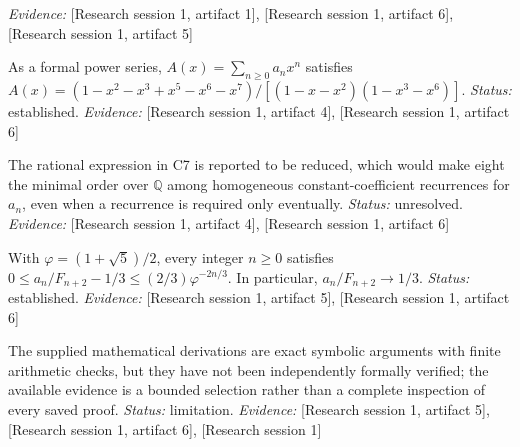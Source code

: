 \documentclass[11pt]{article}
\begin{document}
\begin{sloppypar}
\begin{description}
\textit{Evidence: }[Research session 1, artifact 1], [Research session 1, artifact 6], [Research session 1, artifact 5]
\item[C7] As a formal power series, $A(x)=\sum_{n\geq 0}a_nx^n$ satisfies $A(x)=(1-x^2-x^3+x^5-x^6-x^7)/[(1-x-x^2)(1-x^3-x^6)]$. \textit{Status: }established.
\textit{Evidence: }[Research session 1, artifact 4], [Research session 1, artifact 6]
\item[C8] The rational expression in C7 is reported to be reduced, which would make eight the minimal order over $\mathbb{Q}$ among homogeneous constant-coefficient recurrences for $a_n$, even when a recurrence is required only eventually. \textit{Status: }unresolved.
\textit{Evidence: }[Research session 1, artifact 4], [Research session 1, artifact 6]
\item[C9] With $\varphi=(1+\sqrt{5})/2$, every integer $n\geq 0$ satisfies $0\leq a_n/F_{n+2}-1/3\leq (2/3)\varphi^{-2n/3}$. In particular, $a_n/F_{n+2}\to 1/3$. \textit{Status: }established.
\textit{Evidence: }[Research session 1, artifact 5], [Research session 1, artifact 6]
\item[C10] The supplied mathematical derivations are exact symbolic arguments with finite arithmetic checks, but they have not been independently formally verified; the available evidence is a bounded selection rather than a complete inspection of every saved proof. \textit{Status: }limitation.
\textit{Evidence: }[Research session 1, artifact 5], [Research session 1, artifact 6], [Research session 1]
\end{description}
\end{sloppypar}
\end{document}
